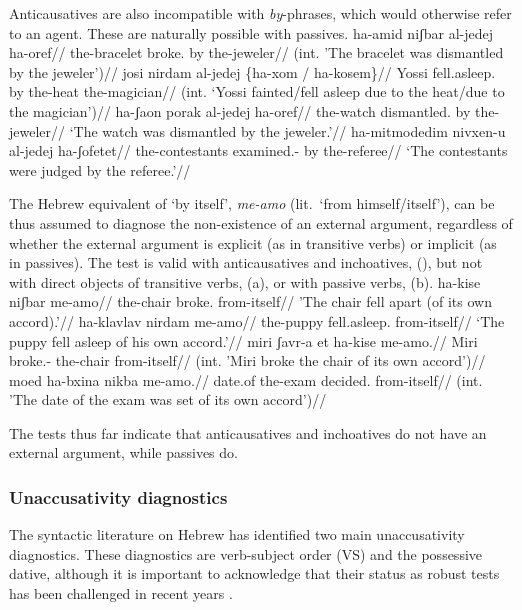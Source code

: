 Anticausatives are also incompatible with \emph{by}-phrases, which would otherwise refer to an agent. These are naturally possible with passives.
\pex
	\a \ljudge{*} \begingl
		\gla ha-{\ts}amid niʃbar al-jedej ha-{\ts}oref//
		\glb the-bracelet broke. by the-jeweler//
		\glft (int. 'The bracelet was dismantled by the jeweler')//
	\endgl
	\a \ljudge{*} \begingl
		\gla josi nirdam al-jedej \{ha-xom / ha-kosem\}//
		\glb Yossi fell.asleep. by the-heat {} the-magician//
		\glft (int. `Yossi fainted/fell asleep due to the heat/due to the magician')//
	\endgl
\xe
\pex
	\a \begingl
		\gla ha-ʃaon porak al-jedej ha-{\ts}oref//
		\glb the-watch dismantled. by the-jeweler//
		\glft `The watch was dismantled by the jeweler.'//
		\endgl
	\a \begingl
		\gla ha-mitmodedim nivxen-u al-jedej ha-ʃofetet//
		\glb the-contestants examined.- by the-referee//
		\glft `The contestants were judged by the referee.'//
		\endgl
\xe

The Hebrew equivalent of `by itself', \emph{me-a{\ts}mo} (lit.~`from himself/itself'), can be thus assumed to diagnose the non-existence of an external argument, regardless of whether the external argument is explicit (as in transitive verbs) or implicit (as in passives). The test is valid with anticausatives and inchoatives, (\nextx), but not with direct objects of transitive verbs, (\anextx a), or with passive verbs, (\anextx b).
\pex
	\a \begingl
		\gla ha-kise niʃbar me-a{\ts}mo//
	     \glb the-chair broke. from-itself//
	     \glft  'The chair fell apart (of its own accord).'//
    \endgl
	\a \begingl
		\gla ha-klavlav nirdam me-a{\ts}mo//
		\glb the-puppy fell.asleep. from-itself//
		\glft `The puppy fell asleep of his own accord.'//
	\endgl
\xe
\pex
    \a \ljudge{*} \begingl
	    \gla miri ʃavr-a et ha-kise me-a{\ts}mo.//
	    \glb Miri broke.-  the-chair from-itself//
	    \glft (int. 'Miri broke the chair of its own accord')//
    \endgl
    \a \ljudge{*} \begingl
	    \gla moed ha-bxina nikba me-a{\ts}mo.//
	    \glb date.of the-exam decided. from-itself//
	    \glft (int. 'The date of the exam was set of its own accord')//
   \endgl
\xe
    
The tests thus far indicate that anticausatives and inchoatives do not have an external argument, while passives do.

	\subsubsection{Unaccusativity diagnostics} \label{vz:tnif:nact:unacc}
The syntactic literature on Hebrew has identified two main unaccusativity diagnostics. These diagnostics are verb-subject order (VS) and the possessive dative, although it is important to acknowledge that their status as robust tests has been challenged in recent years \citep{gafter14li,linzen14pd,kastner17gjgl}.

